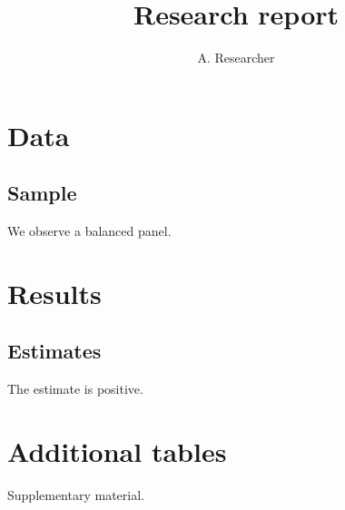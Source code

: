 \documentclass[11pt,a4paper,oneside]{report}
\begin{document}
\title{Research report}\author{A. Researcher}\date{}\maketitle
\tableofcontents
\chapter{Data}\section{Sample}We observe a balanced panel.
\chapter{Results}\section{Estimates}The estimate is positive.
\appendix\chapter{Additional tables}Supplementary material.
\end{document}
